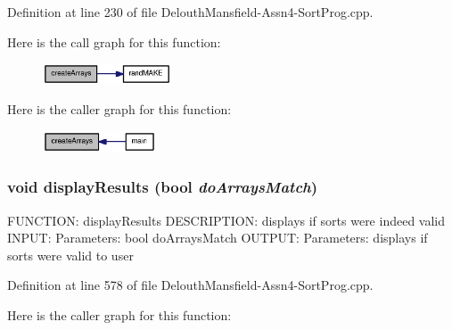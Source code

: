 Definition at line 230 of file DelouthMansfield-\/Assn4-\/SortProg.cpp.



Here is the call graph for this function:\nopagebreak
\begin{figure}[H]
\begin{center}
\leavevmode
\includegraphics[width=108pt]{_delouth_mansfield-_assn4-_sort_prog_8cpp_af209aad9d447548ca062515ab1acbe3c_cgraph}
\end{center}
\end{figure}




Here is the caller graph for this function:\nopagebreak
\begin{figure}[H]
\begin{center}
\leavevmode
\includegraphics[width=95pt]{_delouth_mansfield-_assn4-_sort_prog_8cpp_af209aad9d447548ca062515ab1acbe3c_icgraph}
\end{center}
\end{figure}


\hypertarget{_delouth_mansfield-_assn4-_sort_prog_8cpp_a6832ddb090d7bf6c3b962acac96e3951}{
\subsubsection[{displayResults}]{\setlength{\rightskip}{0pt plus 5cm}void displayResults (bool {\em doArraysMatch})}}
\label{_delouth_mansfield-_assn4-_sort_prog_8cpp_a6832ddb090d7bf6c3b962acac96e3951}
FUNCTION: displayResults DESCRIPTION: displays if sorts were indeed valid INPUT: Parameters: bool doArraysMatch OUTPUT: Parameters: displays if sorts were valid to user 

Definition at line 578 of file DelouthMansfield-\/Assn4-\/SortProg.cpp.



Here is the caller graph for this function:

